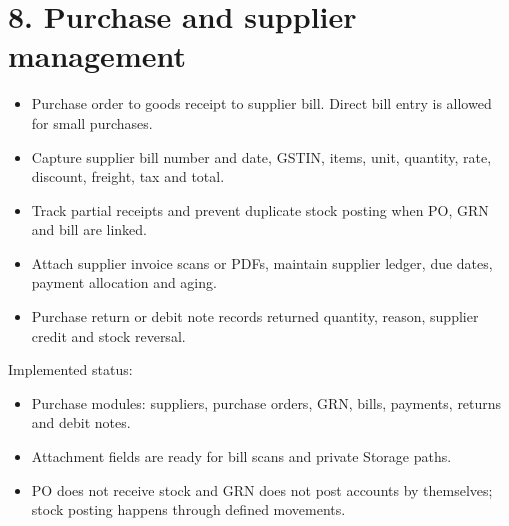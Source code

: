 \documentclass[11pt]{article}
\begin{document}
\section{8. Purchase and supplier management}
\begin{itemize}[leftmargin=*,itemsep=2pt,topsep=2pt]
\item Purchase order to goods receipt to supplier bill. Direct bill entry is allowed for small purchases.
\item Capture supplier bill number and date, GSTIN, items, unit, quantity, rate, discount, freight, tax and total.
\item Track partial receipts and prevent duplicate stock posting when PO, GRN and bill are linked.
\item Attach supplier invoice scans or PDFs, maintain supplier ledger, due dates, payment allocation and aging.
\item Purchase return or debit note records returned quantity, reason, supplier credit and stock reversal.
\end{itemize}
Implemented status:
\begin{itemize}[leftmargin=*,itemsep=2pt,topsep=2pt]
\item Purchase modules: suppliers, purchase orders, GRN, bills, payments, returns and debit notes.
\item Attachment fields are ready for bill scans and private Storage paths.
\item PO does not receive stock and GRN does not post accounts by themselves; stock posting happens through defined movements.
\end{itemize}
\clearpage
\end{document}

